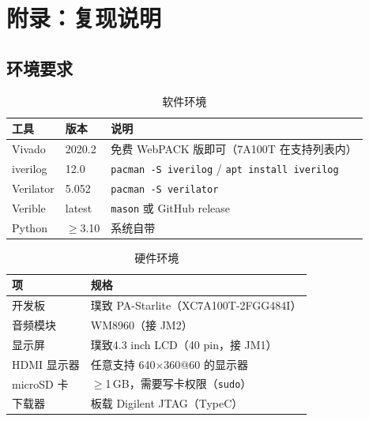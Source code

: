 \documentclass[withoutpreface,bwprint]{cumcmthesis}
\begin{document}
\newpage
\appendix
\section{附录：复现说明}

\subsection{环境要求}

\begin{table}[H]
\centering
\caption{软件环境}
\label{tab:env}
\begin{tabular}{lll}
\toprule[1.5pt]
\rowcolor{gray!25} 工具 & 版本 & 说明 \\
\midrule[1pt]
Vivado     & 2020.2 & 免费 WebPACK 版即可（7A100T 在支持列表内）\\
iverilog   & 12.0   & \texttt{pacman -S iverilog} / \texttt{apt install iverilog} \\
Verilator  & 5.052  & \texttt{pacman -S verilator} \\
Verible    & latest & \texttt{mason} 或 GitHub release \\
Python     & $\ge$3.10 & 系统自带 \\
\bottomrule[1.5pt]
\end{tabular}
\end{table}

\begin{table}[H]
\centering
\caption{硬件环境}
\label{tab:env-hw}
\begin{tabular}{ll}
\toprule[1.5pt]
\rowcolor{gray!25} 项 & 规格 \\
\midrule[1pt]
开发板     & 璞致 PA-Starlite（XC7A100T-2FGG484I）\\
音频模块   & WM8960（接 JM2）\\
显示屏     & 璞致4.3 inch LCD（40 pin，接 JM1）\\
HDMI 显示器 & 任意支持 640$\times$360@60 的显示器 \\
microSD 卡 & $\ge$1\,GB，需要写卡权限（\texttt{sudo}）\\
下载器     & 板载 Digilent JTAG（TypeC）\\
\bottomrule[1.5pt]
\end{tabular}
\end{table}
\end{document}
